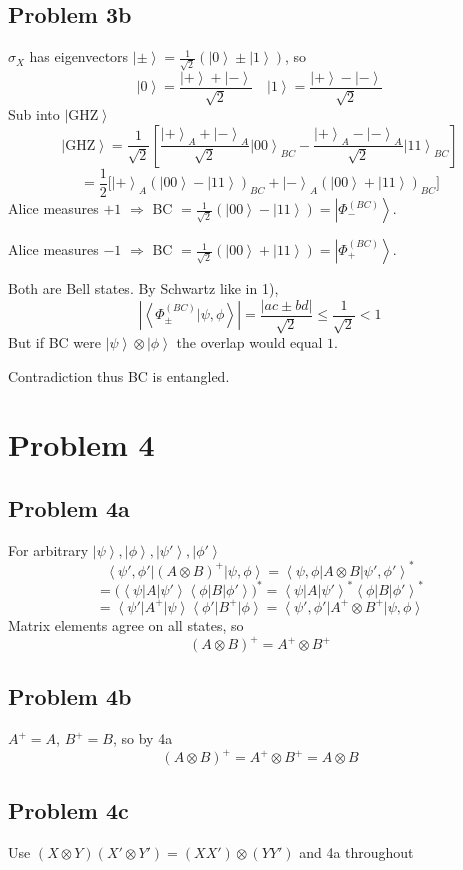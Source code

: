 \documentclass[
]{article}
\providecommand{\ket}[1]{\left\lvert #1 \right\rangle}
\providecommand{\bra}[1]{\left\langle #1 \right\rvert}
\providecommand{\braket}[1]{\left\langle #1 \right\rangle}
\providecommand{\Rarr}{\Rightarrow}
\begin{document}
\subsection*{Problem 3b}
$\sigma_X$ has eigenvectors $\ket{\pm}=\frac{1}{\sqrt{2}}(\ket{0}\pm\ket{1})$, so
\[
	\ket{0}=\frac{\ket{+}+\ket{-}}{\sqrt{2}}\quad \ket{1}=\frac{\ket{+}-\ket{-}}{\sqrt{2}}
\]
Sub into $\ket{\text{GHZ}}$
\[
	\ket{\text{GHZ}}=\frac{1}{\sqrt{2}}\left[\frac{\ket{+}_A+\ket{-}_A}{\sqrt{2}}\ket{00}_{BC}-\frac{\ket{+}_A-\ket{-}_A}{\sqrt{2}}\ket{11}_{BC}\right]
\]
\[
	=\frac{1}{2}\Big[\ket{+}_A(\ket{00}-\ket{11})_{BC}+\ket{-}_A(\ket{00}+\ket{11})_{BC}\Big]
\]
Alice measures $+1$ $\Rarr$ BC $=\frac{1}{\sqrt{2}}(\ket{00}-\ket{11})=\ket{\Phi_-^{(BC)}}$.

Alice measures $-1$ $\Rarr$ BC $=\frac{1}{\sqrt{2}}(\ket{00}+\ket{11})=\ket{\Phi_+^{(BC)}}$.

Both are Bell states. By Schwartz like in 1),
\[
	\left|\braket{\Phi_\pm^{(BC)}|\psi,\phi}\right|=\frac{|ac\pm bd|}{\sqrt{2}}\leq\frac{1}{\sqrt{2}}<1
\]
But if BC were $\ket{\psi}\otimes\ket{\phi}$ the overlap would equal $1$.

Contradiction thus BC is entangled.

\section*{Problem 4}

\subsection*{Problem 4a}
For arbitrary $\ket{\psi},\ket{\phi},\ket{\psi'},\ket{\phi'}$
\[
	\bra{\psi',\phi'}(A\otimes B)^+\ket{\psi,\phi}=\braket{\psi,\phi|A\otimes B|\psi',\phi'}^*
\]
\[
	=\big(\bra{\psi}A\ket{\psi'}\bra{\phi}B\ket{\phi'}\big)^*=\bra{\psi}A\ket{\psi'}^*\bra{\phi}B\ket{\phi'}^*
\]
\[
	=\bra{\psi'}A^+\ket{\psi}\bra{\phi'}B^+\ket{\phi}=\bra{\psi',\phi'}A^+\otimes B^+\ket{\psi,\phi}
\]
Matrix elements agree on all states, so
\[
	(A\otimes B)^+=A^+\otimes B^+
\]

\subsection*{Problem 4b}
$A^+=A$, $B^+=B$, so by 4a
\[
	(A\otimes B)^+=A^+\otimes B^+=A\otimes B
\]

\subsection*{Problem 4c}
Use $(X\otimes Y)(X'\otimes Y')=(XX')\otimes(YY')$ and 4a throughout
\end{document}
